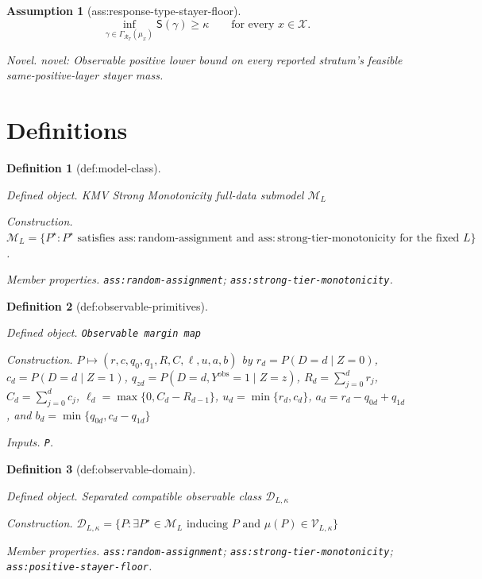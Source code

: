 \documentclass{article}
\newtheorem{assumption}{Assumption}
\newtheorem{definition}{Definition}
\begin{document}
\begin{assumption}[ass:response-type-stayer-floor]\label{ass:response-type-stayer-floor}
\[\inf_{\gamma\in\Gamma_{\mathcal R_T}(\mu_x)}\mathsf S(\gamma)\ge\kappa\qquad\text{for every }x\in\mathcal X.\]
\par\smallskip\noindent\emph{Novel.} novel: Observable positive lower bound on every reported stratum's feasible same-positive-layer stayer mass.
\end{assumption}

\section{Definitions}

\begin{definition}[def:model-class]\label{def:model-class}
\par\smallskip\noindent\emph{Defined object.} KMV Strong Monotonicity full-data submodel \(\mathcal M_L\)
\par\smallskip\noindent\emph{Construction.} \(\mathcal M_L=\{P^{\star}: P^{\star}\text{ satisfies }\mathrm{ass{:}random\mbox{-}assignment}\text{ and }\mathrm{ass{:}strong\mbox{-}tier\mbox{-}monotonicity}\text{ for the fixed }L\}\).
\par\smallskip\noindent\emph{Member properties.} \texttt{ass:\allowbreak{}random-\allowbreak{}assignment}; \texttt{ass:\allowbreak{}strong-\allowbreak{}tier-\allowbreak{}monotonicity}.
\end{definition}

\begin{definition}[def:observable-primitives]\label{def:observable-primitives}
\par\smallskip\noindent\emph{Defined object.} \texttt{Observable margin map}
\par\smallskip\noindent\emph{Construction.} \(P\mapsto(r,c,q_0,q_1,R,C,\ell,u,a,b)\) by \(r_d=P(D=d\mid Z=0)\), \(c_d=P(D=d\mid Z=1)\), \(q_{zd}=P(D=d,Y^{\mathrm{obs}}=1\mid Z=z)\), \(R_d=\sum_{j=0}^{d}r_j\), \(C_d=\sum_{j=0}^{d}c_j\), \(\ell_d=\max\{0,C_d-R_{d-1}\}\), \(u_d=\min\{r_d,c_d\}\), \(a_d=r_d-q_{0d}+q_{1d}\), and \(b_d=\min\{q_{0d},c_d-q_{1d}\}\)
\par\smallskip\noindent\emph{Inputs.} \texttt{P}.
\end{definition}

\begin{definition}[def:observable-domain]\label{def:observable-domain}
\par\smallskip\noindent\emph{Defined object.} Separated compatible observable class \(\mathcal D_{L,\kappa}\)
\par\smallskip\noindent\emph{Construction.} \(\mathcal D_{L,\kappa}=\{P:\exists P^{\star}\in\mathcal M_L\text{ inducing }P\text{ and }\mu(P)\in\mathcal V_{L,\kappa}\}\)
\par\smallskip\noindent\emph{Member properties.} \texttt{ass:\allowbreak{}random-\allowbreak{}assignment}; \texttt{ass:\allowbreak{}strong-\allowbreak{}tier-\allowbreak{}monotonicity}; \texttt{ass:\allowbreak{}positive-\allowbreak{}stayer-\allowbreak{}floor}.
\end{definition}
\end{document}
